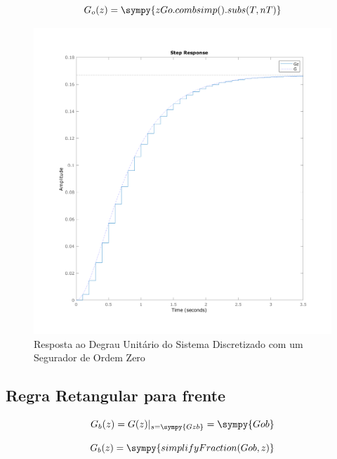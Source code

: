 \documentclass[a4paper,11pt]{article}
\begin{document}
\begin{equation}
  G_o(z) = \sympy{zGo.combsimp().subs(T,nT)}
\end{equation}

\begin{figure}[H]
    \centering
    \includegraphics[width=0.8\linewidth]{img/exsim2-plot-g-zoh.png}
    \caption{Resposta ao Degrau Unitário do Sistema Discretizado com um Segurador de Ordem Zero}
\end{figure}

\subsection{Regra Retangular para frente}

$$
G_b(z) =  G(z)|_{s = \sympy{Gzb}} = \sympy{Gob}
$$

\begin{equation}
    G_b(z) = \sympy{simplifyFraction(Gob,z)}
\end{equation}
\end{document}
